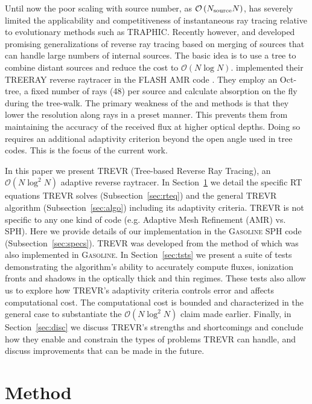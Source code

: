 \documentclass[fleq,usenatbib]{mnras}
\newcommand{\acro}{TREVR}
\newcommand{\bigO}[1]{\mathcal{O}\left(#1\right)}
\newcommand{\NS}{N_{\rm source}}
\begin{document}
{Until now the poor scaling with source number, as $\bigO{\NS N}$, has severely 
limited the applicability and competitiveness of instantaneous ray tracing 
relative to evolutionary methods such as TRAPHIC. Recently however, 
\cite{Woods2015} and \cite{HaidEt18} developed promising generalizations of 
reverse ray tracing based on merging of sources that can handle large numbers 
of internal sources. The basic idea is to use a tree to combine distant 
sources and reduce the cost to $\bigO{N \log N}$. \cite{HaidEt18} implemented 
their TREERAY reverse raytracer in the FLASH AMR code \citep{FryxellEt2000}.
They employ an Oct-tree, a fixed number of rays (48) per source and calculate 
absorption on the fly during the tree-walk.  The primary weakness of the 
\cite{Woods2015} and \cite{HaidEt18} methods is that they lower the resolution 
along rays in a preset manner.  This prevents them from maintaining the 
accuracy of the received flux at higher optical depths. Doing so requires an 
additional adaptivity criterion beyond the open angle used in tree codes.
This is the focus of the current work.

In this paper we present \acro{} (Tree-based Reverse Ray Tracing), an $\bigO{N 
\log^2 N}$ adaptive reverse raytracer. In Section~\ref{sec:mthd} we detail 
the specific RT equations \acro{} solves (Subsection~\ref{sec:rteq}) and the 
general \acro{} algorithm (Subsection~\ref{sec:algo}) including its adaptivity 
criteria. \acro{} is not specific to any one kind of code (e.g. Adaptive Mesh 
Refinement (AMR) vs. SPH). Here we provide details of our implementation in 
the \textsc{Gasoline} SPH code (Subsection~\ref{sec:specs}). \acro{} was 
developed from the method of \cite{Woods2015} which was also implemented in 
\textsc{Gasoline}. In Section~\ref{sec:tsts} we present a suite of tests 
demonstrating the algorithm's ability to accurately compute fluxes, ionization 
fronts and shadows in the optically thick and thin regimes. These tests also 
allow us to explore how \acro{}'s adaptivity criteria controls error and 
affects computational cost. The computational cost is bounded and 
characterized in the general case to substantiate the $\bigO{N \log^2 N}$ 
claim made earlier. Finally, in Section~\ref{sec:disc} we discuss \acro{}'s 
strengths and shortcomings and conclude how they enable and constrain the 
types of problems \acro{} can handle, and discuss improvements that can be 
made in the future.

\section{Method}\label{sec:mthd}
}
\end{document}
